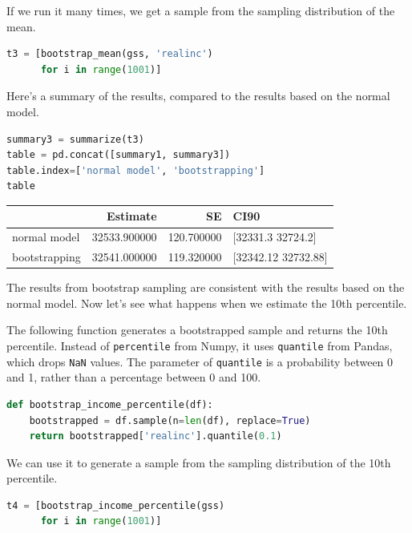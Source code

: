 If we run it many times, we get a sample from the sampling distribution
of the mean.

\begin{lstlisting}[language=Python,style=source]
t3 = [bootstrap_mean(gss, 'realinc')
      for i in range(1001)]
\end{lstlisting}

Here's a summary of the results, compared to the results based on the
normal model.

\begin{lstlisting}[language=Python,style=source]
summary3 = summarize(t3)
table = pd.concat([summary1, summary3])
table.index=['normal model', 'bootstrapping']
table
\end{lstlisting}

\begin{tabular}{lrrl}
\midrule
 & Estimate & SE & CI90 \\
\midrule
normal model & 32533.900000 & 120.700000 & [32331.3 32724.2] \\
bootstrapping & 32541.000000 & 119.320000 & [32342.12 32732.88] \\
\midrule
\end{tabular}

The results from bootstrap sampling are consistent with the results
based on the normal model. Now let's see what happens when we estimate
the 10th percentile.

The following function generates a bootstrapped sample and returns the
10th percentile. Instead of \passthrough{\lstinline!percentile!} from
Numpy, it uses \passthrough{\lstinline!quantile!} from Pandas, which
drops \passthrough{\lstinline!NaN!} values. The parameter of
\passthrough{\lstinline!quantile!} is a probability between 0 and 1,
rather than a percentage between 0 and 100.

\begin{lstlisting}[language=Python,style=source]
def bootstrap_income_percentile(df):
    bootstrapped = df.sample(n=len(df), replace=True)
    return bootstrapped['realinc'].quantile(0.1)
\end{lstlisting}

We can use it to generate a sample from the sampling distribution of the
10th percentile.

\begin{lstlisting}[language=Python,style=source]
t4 = [bootstrap_income_percentile(gss)
      for i in range(1001)]
\end{lstlisting}

